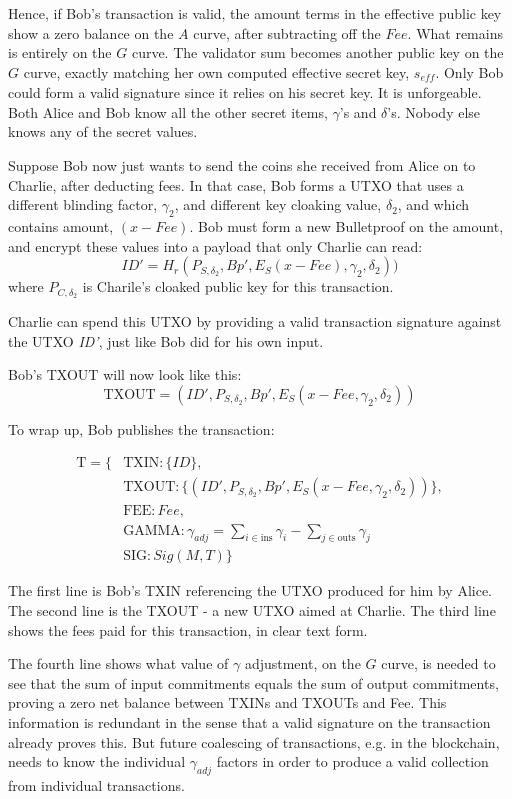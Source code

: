 \documentclass[a4paper, 10pt, conference]{ieeeconf}
\begin{document}
Hence, if Bob's transaction is valid, the amount terms in the effective public key show a zero balance on the $A$ curve, after subtracting off the $\mathit{Fee}$. What remains is entirely on the $G$ curve. The validator sum becomes another public key on the $G$ curve, exactly matching her own computed effective secret key, $s_{\mathit{eff}}$. Only Bob could form a valid signature since it relies on his secret key. It is unforgeable. Both Alice and Bob know all the other secret items, $\gamma$'s and $\delta$'s. Nobody else knows any of the secret values.

Suppose Bob now just wants to send the coins she received from Alice on to Charlie, after deducting fees. In that case, Bob forms a UTXO that uses a different blinding factor, $\gamma_2$, and different key cloaking value, $\delta_2$, and which contains amount, $(x - \mathit{Fee})$. Bob must form a new Bulletproof on the amount, and encrypt these values into a payload that only Charlie can read:
$$ID' = H_r(P_{S, \delta_2}, Bp', E_S(x - Fee), \gamma_2, \delta_2))$$
where $P_{C, \delta_2}$ is Charile's cloaked public key for this transaction. 

Charlie can spend this UTXO by providing a valid transaction signature against the UTXO \textit{ID'}, just like Bob did for his own input. 

Bob's TXOUT will now look like this:
$$\text{TXOUT} = (ID', P_{S, \delta_2}, Bp', E_S(x - Fee, \gamma_2, \delta_2))$$

To wrap up, Bob publishes the transaction:

\begin{align*}
\text{T} = \{&\text{TXIN} : \{\mathit{ID}\}, \\
 &\text{TXOUT} : \{(\mathit{ID'}, P_{S, \delta_2}, \mathit{Bp'}, E_S(x - \mathit{Fee}, \gamma_2, \delta_2))\}, \\
 &\text{FEE} : \mathit{Fee}, \\
 &\text{GAMMA} : \gamma_{\mathit{adj}} = \sum_{i \in \text{ins}}{\gamma_i} - \sum_{j \in \text{outs}}{\gamma_j}\\
 &\text{SIG} : \mathit{Sig}(M, T)\}
\end{align*}

The first line is Bob's TXIN referencing the UTXO produced for him by Alice. The second line is the TXOUT - a new UTXO aimed at Charlie. The third line shows the fees paid for this transaction, in clear text form. 

The fourth line shows what value of $\gamma$ adjustment, on the $G$ curve, is needed to see that the sum of input commitments equals the sum of output commitments, proving a zero net balance between TXINs and TXOUTs and Fee. This information is redundant in the sense that a valid signature on the transaction already proves this. But future coalescing of transactions, e.g. in the blockchain, needs to know the individual $\gamma_{\mathit{adj}}$ factors in order to produce a valid collection from individual transactions.
\end{document}
